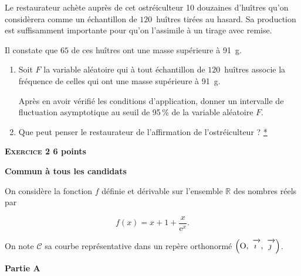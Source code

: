 \documentclass[10pt]{article}
\newcommand{\R}{\mathbb{R}}
\newcommand{\vect}[1]{\mathchoice%
{\overrightarrow{\displaystyle\mathstrut#1\,\,}}%
{\overrightarrow{\textstyle\mathstrut#1\,\,}}%
{\overrightarrow{\scriptstyle\mathstrut#1\,\,}}%
{\overrightarrow{\scriptscriptstyle\mathstrut#1\,\,}}}
\def\Oij{$\left(\text{O},~\vect{\imath},~\vect{\jmath}\right)$}
\begin{document}
\medskip
 
Le restaurateur achète auprès de cet ostréiculteur 10 douzaines d'huîtres qu'on considèrera comme un échantillon de $120$~huîtres tirées au hasard. Sa production est suffisamment importante pour qu'on l'assimile à un tirage avec remise.
 
Il constate que $65$ de ces huîtres ont une masse supérieure à 91~g.

\medskip
 
\begin{enumerate}
\item Soit $F$ la variable aléatoire qui à tout échantillon de $120$~huîtres associe la fréquence de celles qui ont une masse supérieure à 91~g. 

Après en avoir vérifié les conditions d'application, donner un intervalle de fluctuation asymptotique au seuil de 95\,\% de la variable aléatoire $F$. 
\item Que peut penser le restaurateur de l'affirmation de l'ostréiculteur ?
\hyperlink{Index}{*} 
\end{enumerate} 

\vspace{0,5cm}

\textbf{\textsc{Exercice 2} \hfill 6 points}
 
\textbf{Commun à tous les candidats}

\medskip 

On considère la fonction $f$ définie et dérivable sur l'ensemble $\R$ des nombres réels par 

\[f(x) = x + 1 + \dfrac{x}{\text{e}^x}.\]

On note $\mathcal{C}$ sa courbe représentative dans un repère orthonormé \Oij. 

\medskip

\textbf{Partie A}

\medskip
\end{document}
